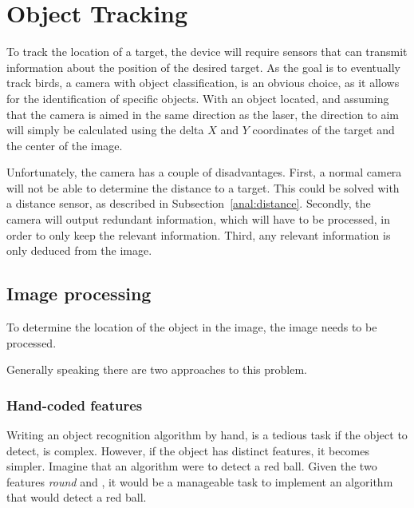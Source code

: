 \section{Object Tracking}
\label{sec:obj_tracking}
To track the location of a target, the device will require sensors that can transmit information about the position of the desired target.
As the goal is to eventually track birds, a camera with object classification, is an obvious choice, as it allows for the identification of specific objects.
With an object located, and assuming that the camera is aimed in the same direction as the laser, the direction to aim will simply be calculated using the delta $X$ and $Y$ coordinates of the target and the center of the image.

Unfortunately, the camera has a couple of disadvantages.
First, a normal camera will not be able to determine the distance to a target.
This could be solved with a distance sensor, as described in Subsection~\ref{anal:distance}.
Secondly, the camera will output redundant information, which will have to be processed, in order to only keep the relevant information.
Third, any relevant information is only deduced from the image. 

\subsection{Image processing}
To determine the location of the object in the image, the image needs to be processed.

Generally speaking there are two approaches to this problem.
\subsubsection{Hand-coded features}
Writing an object recognition algorithm by hand, is a tedious task if the object to detect, is complex.
However, if the object has distinct features, it becomes simpler.
Imagine that an algorithm were to detect a red ball. 
Given the two features \textit{round} and , it would be a manageable task to implement an algorithm that would detect a red ball.


